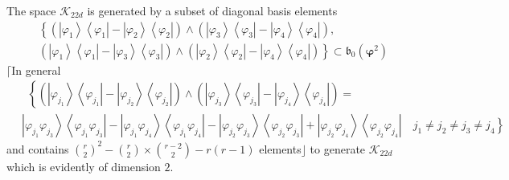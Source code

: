 \documentclass[aps,preprint]{revtex4}%
\begin{document}
The space $\mathcal{K}_{22d}$ is generated by a subset of diagonal basis
elements
\begin{align}
&  \left\{  \left(  \left\vert \varphi_{1}\right\rangle \left\langle
\varphi_{1}\right\vert -\left\vert \varphi_{2}\right\rangle \left\langle
\varphi_{2}\right\vert \right)  \wedge\left(  \left\vert \varphi
_{3}\right\rangle \left\langle \varphi_{3}\right\vert -\left\vert \varphi
_{4}\right\rangle \left\langle \varphi_{4}\right\vert \right)  ,\right.
\nonumber\\
&  \left.  \left(  \left\vert \varphi_{1}\right\rangle \left\langle
\varphi_{1}\right\vert -\left\vert \varphi_{3}\right\rangle \left\langle
\varphi_{3}\right\vert \right)  \wedge\left(  \left\vert \varphi
_{2}\right\rangle \left\langle \varphi_{2}\right\vert -\left\vert \varphi
_{4}\right\rangle \left\langle \varphi_{4}\right\vert \right)  \right\}
\subset\mathfrak{b}_{0}\left(  \mathbf{\varphi}^{2}\right)
\end{align}
$\mathbf{\lceil}$In general
\begin{align}
&  \text{ }\left\{  \left(  \left\vert \varphi_{j_{1}}\right\rangle
\left\langle \varphi_{j_{1}}\right\vert -\left\vert \varphi_{j_{2}%
}\right\rangle \left\langle \varphi_{j_{2}}\right\vert \right)  \wedge\left(
\left\vert \varphi_{j_{3}}\right\rangle \left\langle \varphi_{j_{3}%
}\right\vert -\left\vert \varphi_{j_{4}}\right\rangle \left\langle
\varphi_{j_{4}}\right\vert \right)  \right.  =\nonumber\\
&  \,\left\vert \varphi_{j_{1}}\varphi_{j_{3}}\right\rangle \left\langle
\varphi_{j_{1}}\varphi_{j_{3}}\right\vert -\left\vert \varphi_{j_{1}}%
\varphi_{j_{4}}\right\rangle \left\langle \varphi_{j_{1}}\varphi_{j_{4}%
}\right\vert -\left\vert \varphi_{j_{2}}\varphi_{j_{3}}\right\rangle
\left\langle \varphi_{j_{2}}\varphi_{j_{3}}\right\vert +\left\vert
\varphi_{j_{2}}\varphi_{j_{4}}\right\rangle \left\langle \varphi_{j_{2}%
}\varphi_{j_{4}}\right\vert \quad\left.  j_{1}\neq j_{2}\neq j_{3}\neq
j_{4}\right\}
\end{align}
and contains $\binom{r}{2}^{2}-\binom{r}{2}\times\binom{r-2}{2}-r\left(
r-1\right)  $ elements$\rfloor$ to generate $\mathcal{K}_{22d}$ which is
evidently of dimension $2.$
\end{document}
